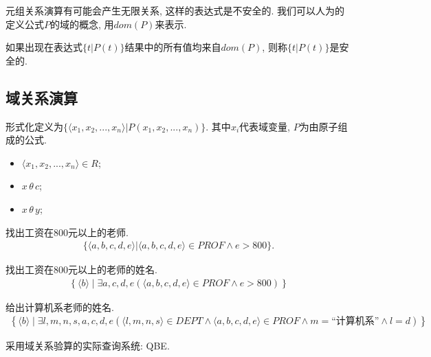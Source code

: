 元组关系演算有可能会产生无限关系, 这样的表达式是不安全的. 我们可以人为的定义公式$P$的域的概念, 用$dom(P)$来表示.

\begin{definition}[安全性]
    如果出现在表达式$\{t|P(t)\}$结果中的所有值均来自$dom(P)$, 则称$\{t|P(t)\}$是安全的.
\end{definition}

\subsection{域关系演算}

\begin{definition}[域关系演算]
    形式化定义为$\{\langle x_1, x_2, ..., x_n\rangle | P(x_1, x_2, ..., x_n)\}$. 其中$x_i$代表域变量, $P$为由原子组成的公式.
    \begin{itemize}
        \item $\langle x_1,x_2,...,x_n \rangle \in R$;
        \item $x\,\theta\,c$;
        \item $x\,\theta\,y$;
    \end{itemize}
\end{definition}

\begin{example}
    找出工资在800元以上的老师.
    \begin{align*}
        \{\langle a,b,c,d,e \rangle |\langle a,b,c,d,e \rangle\in PROF \land e > 800 \}.
    \end{align*}
\end{example}

\begin{example}
    找出工资在800元以上的老师的姓名.
    \begin{align*}
        \left\{ \langle b \rangle \mid \exists a, c, d, e (\langle a,b,c,d,e \rangle \in PROF \land e > 800) \right\}
    \end{align*}
\end{example}

\begin{example}
    给出计算机系老师的姓名.
    \begin{align*}
        \left\{ \langle b \rangle \mid \exists l, m, n, s, a, c, d, e (\langle l,m,n,s \rangle \in DEPT \land \langle a,b,c,d,e \rangle \in PROF \land m = \text{“计算机系”} \land l = d) \right\}
    \end{align*}
\end{example}

采用域关系验算的实际查询系统: QBE.

